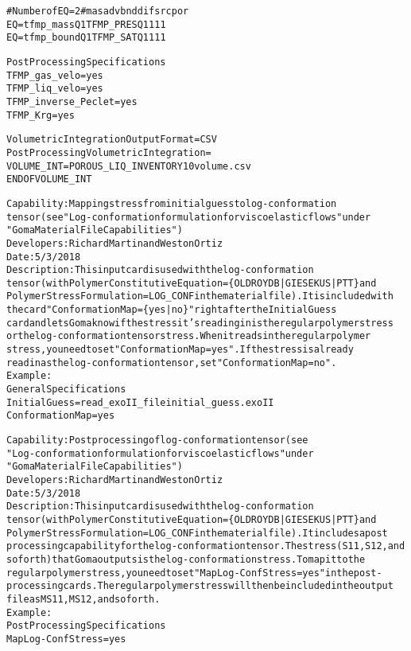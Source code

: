 \documentclass{article}
\begin{document}
\begin{alltt}
#Number of EQ = 2                # mas adv bnd dif src por
EQ = tfmp_mass  Q1  TFMP_PRES  Q1   1   1       1
EQ = tfmp_bound Q1  TFMP_SAT   Q1   1   1           1

Post Processing Specifications
TFMP_gas_velo = yes
TFMP_liq_velo = yes
TFMP_inverse_Peclet = yes
TFMP_Krg = yes

Volumetric Integration Output Format = CSV
Post Processing Volumetric Integration = 
VOLUME_INT = POROUS_LIQ_INVENTORY 1 0 volume.csv
END OF VOLUME_INT

Capability:  Mapping stress from initial guess to log-conformation
tensor (see "Log-conformation formulation for viscoelastic flows" under
"Goma Material File Capabilities")
Developers: Richard Martin and Weston Ortiz
Date: 5/3/2018
Description:  This input card is used with the log-conformation
tensor (with Polymer Constitutive Equation = \{OLDROYDB | GIESEKUS | PTT\} and
Polymer Stress Formulation = LOG_CONF in the material file). It is included with
the card "Conformation Map = \{yes|no\}" right after the Initial Guess
card and lets Goma know if the stress it's reading in is the regular polymer stress
or the log-conformation tensor stress. When it reads in the regular polymer
stress, you need to set "Conformation Map = yes". If the stress is already
read in as the log-conformation tensor, set "Conformation Map = no".
Example:
General Specifications
Initial Guess = read_exoII_file initial_guess.exoII
Conformation Map = yes

Capability:  Post processing of log-conformation tensor (see
"Log-conformation formulation for viscoelastic flows" under
"Goma Material File Capabilities")
Developers: Richard Martin and Weston Ortiz
Date: 5/3/2018
Description:  This input card is used with the log-conformation
tensor (with Polymer Constitutive Equation = \{OLDROYDB | GIESEKUS | PTT\} and
Polymer Stress Formulation = LOG_CONF in the material file). It includes a post
processing capability for the log-conformation tensor. The stress (S11, S12, and
so forth) that Goma outputs is the log-conformation stress. To map it to the
regular polymer stress, you need to set "Map Log-Conf Stress = yes" in the post-
processing cards. The regular polymer stress will then be included in the output
file as MS11, MS12, and so forth.
Example:
Post Processing Specifications
Map Log-Conf Stress = yes

\end{alltt}
\end{document}
